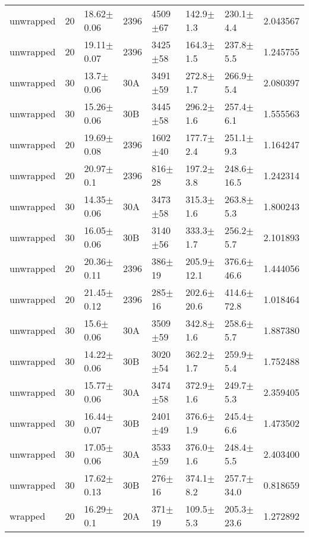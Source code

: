 \begin{tabular}{lrlllllr}
    unwrapped &      20 &   18.62$\pm$0.06 &    2396 &  4509$\pm$67 &   142.9$\pm$1.3 &   230.1$\pm$4.4 &    2.043567 \\
    unwrapped &      20 &   19.11$\pm$0.07 &    2396 &  3425$\pm$58 &   164.3$\pm$1.5 &   237.8$\pm$5.5 &    1.245755 \\
    unwrapped &      30 &    13.7$\pm$0.06 &     30A &  3491$\pm$59 &   272.8$\pm$1.7 &   266.9$\pm$5.4 &    2.080397 \\
    unwrapped &      30 &   15.26$\pm$0.06 &     30B &  3445$\pm$58 &   296.2$\pm$1.6 &   257.4$\pm$6.1 &    1.555563 \\
    unwrapped &      20 &   19.69$\pm$0.08 &    2396 &  1602$\pm$40 &   177.7$\pm$2.4 &   251.1$\pm$9.3 &    1.164247 \\
    unwrapped &      20 &    20.97$\pm$0.1 &    2396 &   816$\pm$28 &   197.2$\pm$3.8 &  248.6$\pm$16.5 &    1.242314 \\
    unwrapped &      30 &   14.35$\pm$0.06 &     30A &  3473$\pm$58 &   315.3$\pm$1.6 &   263.8$\pm$5.3 &    1.800243 \\
    unwrapped &      30 &   16.05$\pm$0.06 &     30B &  3140$\pm$56 &   333.3$\pm$1.7 &   256.2$\pm$5.7 &    2.101893 \\
    unwrapped &      20 &   20.36$\pm$0.11 &    2396 &   386$\pm$19 &  205.9$\pm$12.1 &  376.6$\pm$46.6 &    1.444056 \\
    unwrapped &      20 &   21.45$\pm$0.12 &    2396 &   285$\pm$16 &  202.6$\pm$20.6 &  414.6$\pm$72.8 &    1.018464 \\
    unwrapped &      30 &    15.6$\pm$0.06 &     30A &  3509$\pm$59 &   342.8$\pm$1.6 &   258.6$\pm$5.7 &    1.887380 \\
    unwrapped &      30 &   14.22$\pm$0.06 &     30B &  3020$\pm$54 &   362.2$\pm$1.7 &   259.9$\pm$5.4 &    1.752488 \\
    unwrapped &      30 &   15.77$\pm$0.06 &     30A &  3474$\pm$58 &   372.9$\pm$1.6 &   249.7$\pm$5.3 &    2.359405 \\
    unwrapped &      30 &   16.44$\pm$0.07 &     30B &  2401$\pm$49 &   376.6$\pm$1.9 &   245.4$\pm$6.6 &    1.473502 \\
    unwrapped &      30 &   17.05$\pm$0.06 &     30A &  3533$\pm$59 &   376.0$\pm$1.6 &   248.4$\pm$5.5 &    2.403400 \\
    unwrapped &      30 &   17.62$\pm$0.13 &     30B &   276$\pm$16 &   374.1$\pm$8.2 &  257.7$\pm$34.0 &    0.818659 \\
      wrapped &      20 &    16.29$\pm$0.1 &     20A &   371$\pm$19 &   109.5$\pm$5.3 &  205.3$\pm$23.6 &    1.272892 \\

\end{tabular}

